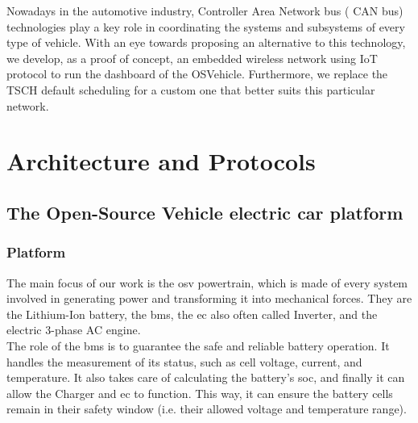 \documentclass[runningheads]{llncs}
\begin{document}
{\color{blue} Nowadays in the automotive industry, Controller Area Network bus (
CAN bus) technologies play a key role in coordinating the systems and subsystems
of every type of vehicle.
With an eye towards proposing an alternative to this technology, we develop, as
a proof of concept, an embedded wireless network using IoT protocol to run the
dashboard of the OSVehicle. Furthermore, we replace the TSCH default scheduling
for a custom one that better suits this particular network. }



\section{Architecture and Protocols}
\subsection{The Open-Source Vehicle electric car platform}


\subsubsection{Platform}

The main focus of our work is the \gls{osv} powertrain, which is 
{\color{blue}made of}
every system involved in generating power and transforming it into mechanical
forces. They are the Lithium-Ion battery, the \gls{bms}, the \gls{ec} 
{\color{blue}also}
often called Inverter, and the electric 3-phase AC engine. \\

The role of the \gls{bms} is to guarantee the safe and reliable battery
operation. It handles the measurement of its status, such as cell voltage,
current, and temperature. It {\color{blue}also} takes care of calculating the 
battery's
\gls{soc}, {\color{blue}and finally it can allow} the Charger and \gls{ec} to 
function.
This way, it can ensure the battery cells remain in their {\color{blue}safety 
window} (i.e.
their allowed voltage and temperature range).

\end{document}
